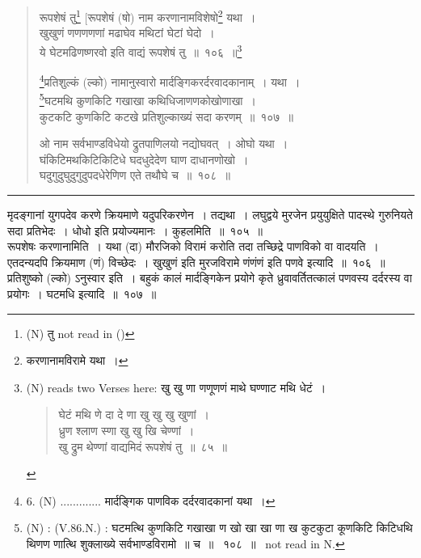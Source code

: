 \documentclass[11pt, openany]{book}
\begin{document}
\begin{quote}
{\na रूपशेषं तु\renewcommand{\thefootnote}{3}\footnote{(N) तु not read in ()} [रूपशेषं (षो) नाम करणानामविशेषो\renewcommand{\thefootnote}{4}\footnote{करणानामविरामे यथा~।} यथा~।\\
खुखुणं णणणणणां मढाघेव मथिटां घेटां घेदो~।\\
ये घेटमढिणष्णरवो इति वाद्यं रूपशेषं तु~॥~१०६~॥\renewcommand{\thefootnote}{5}\footnote{(N) reads two Verses here: खु खु णा णणूणणं माथे घण्णाट मथि धेटं~। 
\begin{quote}
{\qt घेटं मथि णे दा दे णा खु खु खु खुणां~। \\
 ध्रुण श्लाण स्णा खु खु खि चेण्णां~।\\
 खु द्रुम थेण्णां वाद्यमिदं रूपशेषं तु~॥~८५~॥}
\end{quote}}

\renewcommand{\thefootnote}{6}\footnote{6. (N) ............. मार्दङ्गिक पाणविक दर्दरवादकानां यथा~।}प्रतिशुल्कं (ल्को) नामानुस्वारो मार्दङ्गिकरर्दरवादकानाम्~। यथा~।\\
\renewcommand{\thefootnote}{7}\footnote{(N) : (V.86.N.) : घटमत्थि कुणकिटि गखाखा ण खो खा खा णा ख कुटकुटा कूणकिटि किटिधथि थिणण णात्थि शुक्लाख्ये सर्वभाण्डविरामो~॥ च~॥~ १०८~॥~ not read in N.}घटमथि कुणकिटि गखाखा कथिधिजाणणकोखोणाखा~।\\
कुटकटि कुणकिटि कटखे प्रतिशुल्काख्यं सदा करणम्~॥~१०७~॥

ओ नाम सर्वभाण्डविधेयो द्रुतपाणिलयो नद्योघवत्~। ओघो यथा~।\\
घंकिटिमथकिटिकिटिधे घदधुदेदेण घाण दाधानणोखो~।\\
घदुगुदुघुदुगुदुपदधेरेणिण एते तथौघे च~॥~१०८~॥}
\end{quote}

\hrule

\vspace{2mm}
मृदङ्गानां युगपदेव करणे क्रियमाणे यदुपरिकरणेन~। {\qtt तद्यथा}~। लघुद्वये मुरजेन प्रयुयुक्षिते पादस्थे गुरुनियते सदा प्रतिभेदः~। धोधो इति प्रयोज्यमानः~। {\qtt कुहलमिति}~॥~१०५~॥\\

रूपशेषः करणानामिति~। यथा (दा) मौरजिको विरामं करोति तदा तच्छिद्रे पाणविको वा वादयति~। एतदन्यदपि क्रियमाण (णं) विच्छेदः~। खुखुणं इति मुरजविरामे णंणंणं इति पणवे इत्यादि~॥~१०६~॥\\

प्रतिशुष्को (ल्को) ऽनुस्वार इति~। बहुकं कालं मार्दङ्गिकेन प्रयोगे कृते ध्रुवावर्तितत्कालं पणवस्य दर्दरस्य वा प्रयोगः~। घटमधि इत्यादि~॥~१०७~॥\\
\end{document}
